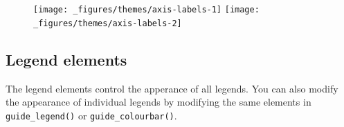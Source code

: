 \begin{Shaded}
\begin{Highlighting}[]
\StringTok{ }\NormalTok{(}
   \NormalTok{(}\NormalTok{, }\NormalTok{, }\NormalTok{), }
   \NormalTok{:}
\NormalTok{)}
\StringTok{ }\StringTok{ }\NormalTok{()}
\StringTok{ }
\StringTok{  }\NormalTok{(} \NormalTok{(} \NormalTok{-}\NormalTok{, } \NormalTok{, } \NormalTok{)) +}\StringTok{ }
\StringTok{  }\NormalTok{(}\NormalTok{) +}\StringTok{ }
\StringTok{  }\NormalTok{(}\NormalTok{)}
\end{Highlighting}
\end{Shaded}

\begin{figure}[H]
  \texttt{[image: \_figures/themes/axis-labels-1]}%
  \texttt{[image: \_figures/themes/axis-labels-2]}
\end{figure}

\subsection{Legend elements}\label{legend-elements}

 

The legend elements control the apperance of all legends. You can also
modify the appearance of individual legends by modifying the same
elements in \texttt{guide\_legend()} or \texttt{guide\_colourbar()}.

